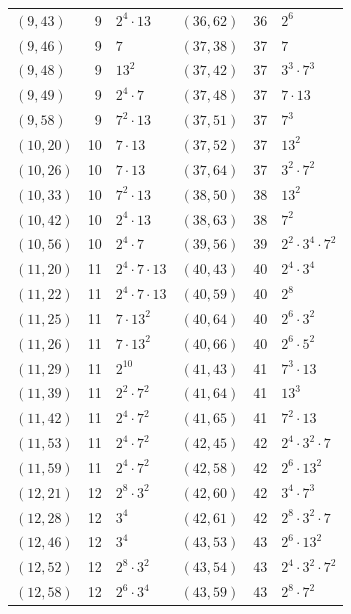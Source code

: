 \documentclass[11pt]{article}
\begin{document}
\begin{longtable}{@{}lrl@{\qquad}lrl@{}}
$(9,43)$ & 9 & $2^{4}\cdot 13$ & $(36,62)$ & 36 & $2^{6}$\\
$(9,46)$ & 9 & $7$ & $(37,38)$ & 37 & $7$\\
$(9,48)$ & 9 & $13^{2}$ & $(37,42)$ & 37 & $3^{3}\cdot 7^{3}$\\
$(9,49)$ & 9 & $2^{4}\cdot 7$ & $(37,48)$ & 37 & $7\cdot 13$\\
$(9,58)$ & 9 & $7^{2}\cdot 13$ & $(37,51)$ & 37 & $7^{3}$\\
$(10,20)$ & 10 & $7\cdot 13$ & $(37,52)$ & 37 & $13^{2}$\\
$(10,26)$ & 10 & $7\cdot 13$ & $(37,64)$ & 37 & $3^{2}\cdot 7^{2}$\\
$(10,33)$ & 10 & $7^{2}\cdot 13$ & $(38,50)$ & 38 & $13^{2}$\\
$(10,42)$ & 10 & $2^{4}\cdot 13$ & $(38,63)$ & 38 & $7^{2}$\\
$(10,56)$ & 10 & $2^{4}\cdot 7$ & $(39,56)$ & 39 & $2^{2}\cdot 3^{4}\cdot 7^{2}$\\
$(11,20)$ & 11 & $2^{4}\cdot 7\cdot 13$ & $(40,43)$ & 40 & $2^{4}\cdot 3^{4}$\\
$(11,22)$ & 11 & $2^{4}\cdot 7\cdot 13$ & $(40,59)$ & 40 & $2^{8}$\\
$(11,25)$ & 11 & $7\cdot 13^{2}$ & $(40,64)$ & 40 & $2^{6}\cdot 3^{2}$\\
$(11,26)$ & 11 & $7\cdot 13^{2}$ & $(40,66)$ & 40 & $2^{6}\cdot 5^{2}$\\
$(11,29)$ & 11 & $2^{10}$ & $(41,43)$ & 41 & $7^{3}\cdot 13$\\
$(11,39)$ & 11 & $2^{2}\cdot 7^{2}$ & $(41,64)$ & 41 & $13^{3}$\\
$(11,42)$ & 11 & $2^{4}\cdot 7^{2}$ & $(41,65)$ & 41 & $7^{2}\cdot 13$\\
$(11,53)$ & 11 & $2^{4}\cdot 7^{2}$ & $(42,45)$ & 42 & $2^{4}\cdot 3^{2}\cdot 7$\\
$(11,59)$ & 11 & $2^{4}\cdot 7^{2}$ & $(42,58)$ & 42 & $2^{6}\cdot 13^{2}$\\
$(12,21)$ & 12 & $2^{8}\cdot 3^{2}$ & $(42,60)$ & 42 & $3^{4}\cdot 7^{3}$\\
$(12,28)$ & 12 & $3^{4}$ & $(42,61)$ & 42 & $2^{8}\cdot 3^{2}\cdot 7$\\
$(12,46)$ & 12 & $3^{4}$ & $(43,53)$ & 43 & $2^{6}\cdot 13^{2}$\\
$(12,52)$ & 12 & $2^{8}\cdot 3^{2}$ & $(43,54)$ & 43 & $2^{4}\cdot 3^{2}\cdot 7^{2}$\\
$(12,58)$ & 12 & $2^{6}\cdot 3^{4}$ & $(43,59)$ & 43 & $2^{8}\cdot 7^{2}$\\

\end{longtable}
\end{document}
